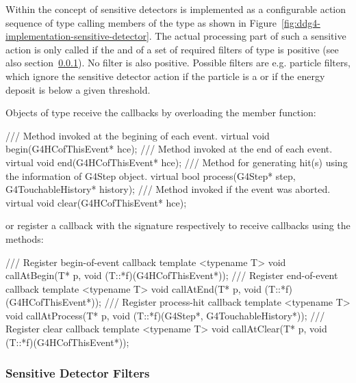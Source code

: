 \documentclass[10pt,a4paper]{article}
\begin{document}
\noindent
Within \DDG the concept of sensitive  detectors is implemented as a
configurable  action sequence of type 
{}
calling members of the type 
{} as shown in 
Figure~\ref{fig:ddg4-implementation-sensitive-detector}. The actual processing
part of such a sensitive action is only called if the and of a set of
required filters of type  is positive (see also 
section~\ref{sec:ddg4-implementation-sensitive-detector-filters}). No filter 
is also positive. Possible filters are e.g. particle filters, which ignore the
sensitive detector action if the particle is a  or if the
energy deposit is below a given threshold.

\noindent
Objects of type  receive the callbacks by overloading the 
member function:
\begin{unnumberedcode}
  /// Method invoked at the begining of each event.
  virtual void begin(G4HCofThisEvent* hce);
  /// Method invoked at the end of each event.
  virtual void end(G4HCofThisEvent* hce);
  /// Method for generating hit(s) using the information of G4Step object.
  virtual bool process(G4Step* step, G4TouchableHistory* history);
  /// Method invoked if the event was aborted.
  virtual void clear(G4HCofThisEvent* hce);
\end{unnumberedcode}
or register a callback with the signature {}
respectively {} 
to receive callbacks using the methods:
\begin{unnumberedcode}
  /// Register begin-of-event callback
  template <typename T> void callAtBegin(T* p, void (T::*f)(G4HCofThisEvent*));
  /// Register end-of-event callback
  template <typename T> void callAtEnd(T* p, void (T::*f)(G4HCofThisEvent*));
  /// Register process-hit callback
  template <typename T> void callAtProcess(T* p, void (T::*f)(G4Step*, G4TouchableHistory*));
  /// Register clear callback
  template <typename T> void callAtClear(T* p, void (T::*f)(G4HCofThisEvent*));
\end{unnumberedcode}

\subsubsection{Sensitive Detector Filters}
\label{sec:ddg4-implementation-sensitive-detector-filters}
\end{document}
